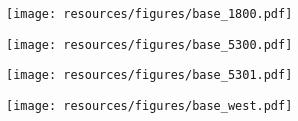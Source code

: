 \begin{figure}[h]
\centering
\begin{minipage}{0.49\textwidth}
  \centering
  \texttt{[image: resources/figures/base\_1800.pdf]}
  \label{fig:appendix_base_1800}
\end{minipage}
\begin{minipage}{0.49\textwidth}
  \centering
  \texttt{[image: resources/figures/base\_5300.pdf]}
  \label{fig:appendix_base_5300}
\end{minipage}
\end{figure}
\begin{figure}[h]
\centering
\begin{minipage}{0.49\textwidth}
  \centering
  \texttt{[image: resources/figures/base\_5301.pdf]}
  \label{fig:appendix_base_5301}
\end{minipage}
\begin{minipage}{0.49\textwidth}
  \centering
  \texttt{[image: resources/figures/base\_west.pdf]}
  \label{fig:appendix_base_west}
\end{minipage}
\end{figure}